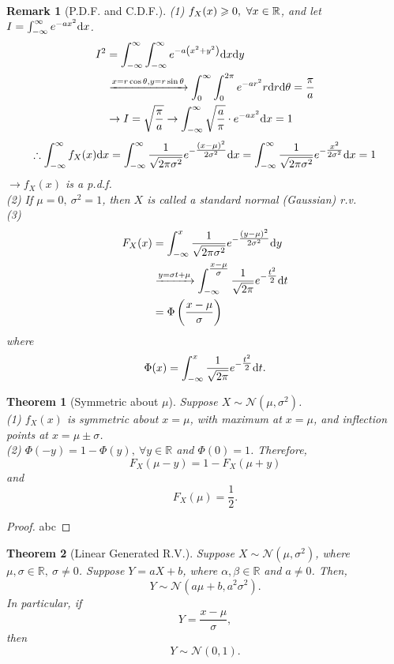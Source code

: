 \documentclass[openany,12pt]{book}
\newtheorem{theorem}{Theorem}[chapter]
\newtheorem{remark}{Remark}[chapter]
\begin{document}
\begin{remark}[P.D.F. and C.D.F.]
(1) $f_X(x)\geqslant0,\ \forall x\in\mathbb{R}$, and let $I=\int_{-\infty}^{\infty}e^{-ax^2}\mathrm{d} x$.
$$\begin{aligned}
I^2&=\int_{-\infty}^{\infty}\int_{-\infty}^{\infty}{e^{-a\left(x^2+y^2\right)}\mathrm{d} x\mathrm{d} y}\\
&\xrightarrow{x=r\cos\theta,y=r\sin\theta}\int_{0}^{\infty}\int_{0}^{2\pi}{e^{-ar^2}r\mathrm{d} r\mathrm{d}\theta}=\frac{\pi}{a}\\
&\to I=\sqrt{\frac{\pi}{a}}\to\int_{-\infty}^{\infty}{\sqrt{\frac{a}{\pi}}}\cdot e^{-ax^2}\mathrm{d} x=1
\end{aligned}
$$
$$
\therefore\int_{-\infty}^{\infty}{f_X(x)}\mathrm{d} x=\int_{-\infty}^{\infty}{\frac{1}{\sqrt{2\pi\sigma^2}}e^{-\tfrac{(x-\mu)^2}{2\sigma^2}}}\mathrm{d} x=\int_{-\infty}^{\infty}{\frac{1}{\sqrt{2\pi\sigma^2}}e^{-\tfrac{x^2}{2\sigma^2}}}\mathrm{d} x=1
$$
$\to f_X(x)$ is a p.d.f.\\
(2) If $\mu=0,\ \sigma^2=1$, then $X$ is called a standard normal (Gaussian) r.v.\\
(3)
$$\begin{aligned}
F_X(x)&=\int_{-\infty}^{x}{\frac{1}{\sqrt{2\pi\sigma^2}}e^{-\tfrac{(y-\mu)^2}{2\sigma^2}}}\mathrm{d} y\\
&\xrightarrow{y=\sigma t+\mu}\int_{-\infty}^{\tfrac{x-\mu}{\sigma}}{\frac{1}{\sqrt{2\pi}}e^{-\tfrac{{t}^2}{2}}}\mathrm{d} t\\
&={\Phi}\left(\frac{x-\mu}{\sigma}\right)\\
\end{aligned}
$$
where
$$
{\Phi}(x)=\int_{-\infty}^{x}{\frac{1}{\sqrt{2\pi}}e^{-\tfrac{{t}^2}{2}}}\mathrm{d} t.
$$
\end{remark}

\begin{theorem}[Symmetric about ${\mu}$]
Suppose $X\sim \mathcal{N}(\mu,\sigma^2)$.\\
(1) $f_X(x)$ is symmetric about $x=\mu$, with maximum at $x=\mu$, and inflection points at $x=\mu\pm\sigma$.\\
(2) $\Phi\left(-y\right)=1-{\Phi}(y),\ \forall y\in\mathbb{R}$ and $\Phi\left(0\right)=1$. Therefore, $$F_X\left(\mu-y\right)=1-F_X\left(\mu+y\right)$$ and $$F_X\left(\mu\right)=\frac{1}{2}.$$
\end{theorem}

\begin{proof}
  abc
\end{proof}

\begin{theorem}[Linear Generated R.V.]
Suppose $X\sim \mathcal{N}(\mu,\sigma^2)$, where $\mu,\sigma\in\mathbb{R},\ \sigma\neq0$. Suppose $Y=aX+b$, where $\alpha,\beta\in\mathbb{R}$ and $a\neq0$. Then,
$$
Y\sim \mathcal{N}\left(a\mu+b,a^2\sigma^2\right).
$$
In particular, if
$$
Y=\frac{x-\mu}{\sigma},
$$
then
$$
Y\sim \mathcal{N}(0,1).
$$
\end{theorem}
\end{document}
